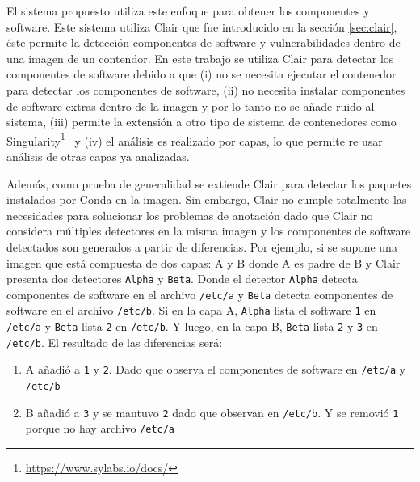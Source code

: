 El sistema propuesto utiliza este enfoque para obtener los componentes y software. Este sistema utiliza Clair que fue introducido en la sección  \ref{sec:clair}, éste permite la detección componentes de software y vulnerabilidades dentro de una imagen de un contendor.
En este trabajo se utiliza Clair para detectar los componentes de software debido a que (i) no se necesita ejecutar el contenedor para detectar los componentes de software, (ii) no necesita instalar componentes de software extras dentro de la imagen y por lo tanto no se añade ruido al sistema, (iii) permite la extensión a otro tipo de sistema de contenedores como Singularity\footnote{\url{https://www.sylabs.io/docs/}}~\cite{kurtzer2017singularity} y (iv) el análisis es realizado por capas, lo que permite re usar análisis de otras capas ya analizadas.

Además, como prueba de generalidad se extiende Clair para detectar los paquetes instalados por Conda en la imagen.  
Sin embargo, Clair no cumple totalmente las necesidades para solucionar los problemas de anotación dado que Clair no considera múltiples detectores en la misma imagen y los componentes de software detectados son generados a partir de diferencias.
Por ejemplo, si se supone una imagen que está compuesta de dos capas: A y B donde A es padre de B y Clair presenta dos detectores \texttt{Alpha} y \texttt{Beta}. Donde el detector \texttt{Alpha} detecta componentes de software en el archivo \verb|/etc/a| y  \texttt{Beta} detecta componentes de software en el archivo \verb|/etc/b|. Si en la capa A, \texttt{Alpha} lista el software \verb|1| en \verb|/etc/a| y \texttt{Beta} lista \verb|2| en  \verb|/etc/b|. Y luego, en la capa B, \texttt{Beta}  lista \verb|2| y \verb|3| en  \verb|/etc/b|. El resultado de las diferencias será: 

\begin{enumerate}
	\item A añadió a \verb|1| y \verb|2|. Dado que observa el componentes de software en \verb|/etc/a| y \verb|/etc/b|
	\item  B añadió a \verb|3| y se mantuvo \verb|2| dado que observan en \verb|/etc/b|. Y se removió \verb|1| porque no hay archivo \verb|/etc/a|
\end{enumerate}

